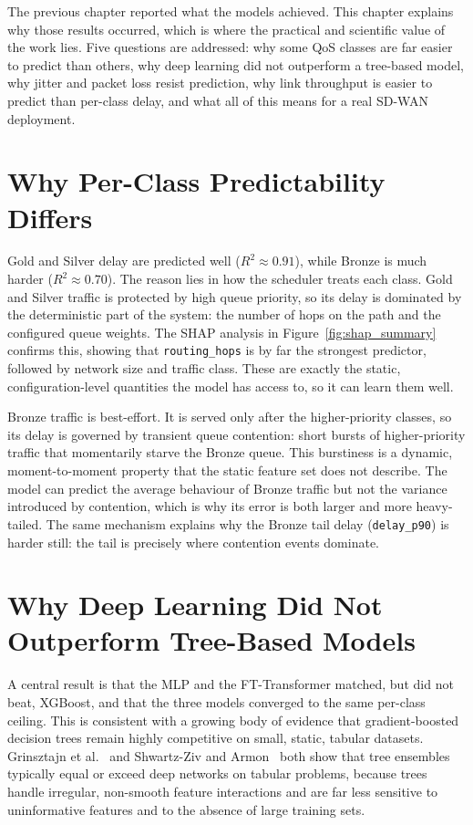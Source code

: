 \documentclass[a4paper,12pt]{Classes/RoboticsLaTeX}
\begin{document}
The previous chapter reported what the models achieved. This chapter explains why those results occurred, which is where the practical and scientific value of the work lies. Five questions are addressed: why some QoS classes are far easier to predict than others, why deep learning did not outperform a tree-based model, why jitter and packet loss resist prediction, why link throughput is easier to predict than per-class delay, and what all of this means for a real SD-WAN deployment.

\section{Why Per-Class Predictability Differs}

Gold and Silver delay are predicted well ($R^2 \approx 0.91$), while Bronze is much harder ($R^2 \approx 0.70$). The reason lies in how the scheduler treats each class. Gold and Silver traffic is protected by high queue priority, so its delay is dominated by the deterministic part of the system: the number of hops on the path and the configured queue weights. The SHAP analysis in Figure~\ref{fig:shap_summary} confirms this, showing that \texttt{routing\_hops} is by far the strongest predictor, followed by network size and traffic class. These are exactly the static, configuration-level quantities the model has access to, so it can learn them well.

Bronze traffic is best-effort. It is served only after the higher-priority classes, so its delay is governed by transient queue contention: short bursts of higher-priority traffic that momentarily starve the Bronze queue. This burstiness is a dynamic, moment-to-moment property that the static feature set does not describe. The model can predict the average behaviour of Bronze traffic but not the variance introduced by contention, which is why its error is both larger and more heavy-tailed. The same mechanism explains why the Bronze tail delay (\texttt{delay\_p90}) is harder still: the tail is precisely where contention events dominate.

\section{Why Deep Learning Did Not Outperform Tree-Based Models}

A central result is that the MLP and the FT-Transformer matched, but did not beat, XGBoost, and that the three models converged to the same per-class ceiling. This is consistent with a growing body of evidence that gradient-boosted decision trees remain highly competitive on small, static, tabular datasets. Grinsztajn et al.~\cite{grinsztajn2022trees} and Shwartz-Ziv and Armon~\cite{shwartzziv2022tabular} both show that tree ensembles typically equal or exceed deep networks on tabular problems, because trees handle irregular, non-smooth feature interactions and are far less sensitive to uninformative features and to the absence of large training sets.
\end{document}
